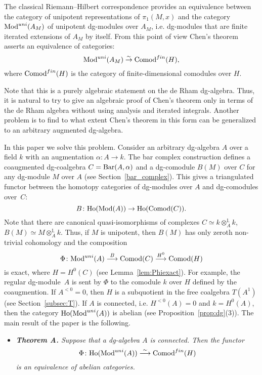\documentclass[10pt,russian]{article}
\theoremstyle{plain}
\theoremstyle{definition}
\newcommand{\Barr}{{\rm Bar}}
\newcommand{\Mod}{{\rm Mod}}
\newcommand{\Comod}{{\rm Comod}}
\newcommand{\Ho}{{\rm Ho}}
\begin{document}
	The classical Riemann--Hilbert correspondence provides an equivalence between the category of unipotent representations of $\pi _1(M, x)$ and the category $\Mod^{uni}(A_M)$ of unipotent dg-modules over $A_M$, i.e. dg-modules that are finite iterated extensions of $A_M$ by itself. From this point of view Chen's theorem asserts an equivalence of categories:
	$$
	\Mod^{uni} (A_M) \stackrel{\sim} \rightarrow \Comod^{fin}(H),
	$$
	where $\Comod^{fin}(H)$ is the category of finite-dimensional comodules over $H$.
	
	Note that this is a purely algebraic statement on the de Rham dg-algebra. Thus, it is natural to try to give an algebraic proof of Chen's theorem only in terms of the de Rham algebra without using analysis and iterated integrals. Another problem is to find to what extent Chen's theorem in this form can be generalized to an arbitrary augmented dg-algebra.

\medskip

In this paper we solve this problem. Consider an arbitrary dg-algebra $A$ over a field $k$ with an augmentation $\alpha\colon A\to k$. The bar complex construction defines a coaugmented dg-coalgebra $C=\Barr(A,\alpha)$ and a dg-comodule $B(M)$ over $C$ for any dg-module $M$ over $A$ (see Section~\ref{bar_complex}). This gives a triangulated functor between the homotopy categories of dg-modules over $A$ and dg-comodules over~$C$:
\begin{equation}\label{eq:Btriang}
B\colon \Ho(\Mod(A))\to \Ho(\Comod(C)).
\end{equation}
Note that there are canonical quasi-isomorphisms of complexes $C\simeq k \otimes_A^{\mathbb L} k$, $B(M)\simeq M \otimes_A^{\mathbb L} k$. Thus, if $M$ is unipotent, then $B(M)$ has only zeroth non-trivial cohomology and the composition
$$
\Phi\colon\Mod^{uni}(A)\stackrel{B}\longrightarrow \Comod(C)\stackrel{H^0}\longrightarrow \Comod(H)
$$
is exact, where $H=H^0(C)$ (see Lemma~\ref{lem:Phiexact}). For example, the regular \mbox{dg-module}~$A$ is sent by $\Phi$ to the comodule $k$ over $H$ defined by the coaugmention. If $A^{<0}=0$, then $H$ is a subquotient in the free coalgebra $T(A^1)$ (see Section~\ref{subsec:T}). If $A$ is connected, i.e. $H^{<0}(A)=0$ and $k=H^0(A)$, then the category $\Ho(\Mod^{uni}(A))$ is abelian (see Proposition~\ref{prop:dg}(3)). The main result of the paper is the following.

\begin{itemize}
\item[]{}

{\it {\bf Theorem A.} Suppose that a dg-algebra $A$ is connected. Then the functor
$$
\Phi\colon\Ho(\Mod^{uni}(A))\stackrel{\sim}\longrightarrow \Comod^{fin}(H)
$$
is an equivalence of abelian categories.
}
\end{itemize}
\end{document}
